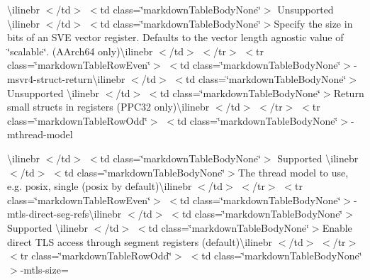 \begin{longtabu}
{\ttfamily \textbackslash{}ilinebr \texorpdfstring{$<$}{<}/td\texorpdfstring{$>$}{>} \texorpdfstring{$<$}{<}td class=\char`\"{}markdown\+Table\+Body\+None\char`\"{}\texorpdfstring{$>$}{>} Unsupported \textbackslash{}ilinebr \texorpdfstring{$<$}{<}/td\texorpdfstring{$>$}{>} \texorpdfstring{$<$}{<}td class=\char`\"{}markdown\+Table\+Body\+None\char`\"{}\texorpdfstring{$>$}{>}}Specify the size in bits of an SVE vector register. Defaults to the vector length agnostic value of \char`\"{}scalable\char`\"{}. (AArch64 only){\ttfamily \textbackslash{}ilinebr \texorpdfstring{$<$}{<}/td\texorpdfstring{$>$}{>} \texorpdfstring{$<$}{<}/tr\texorpdfstring{$>$}{>} \texorpdfstring{$<$}{<}tr class=\char`\"{}markdown\+Table\+Row\+Even\char`\"{}\texorpdfstring{$>$}{>} \texorpdfstring{$<$}{<}td class=\char`\"{}markdown\+Table\+Body\+None\char`\"{}\texorpdfstring{$>$}{>}}-\/msvr4-\/struct-\/return{\ttfamily \textbackslash{}ilinebr \texorpdfstring{$<$}{<}/td\texorpdfstring{$>$}{>} \texorpdfstring{$<$}{<}td class=\char`\"{}markdown\+Table\+Body\+None\char`\"{}\texorpdfstring{$>$}{>} Unsupported \textbackslash{}ilinebr \texorpdfstring{$<$}{<}/td\texorpdfstring{$>$}{>} \texorpdfstring{$<$}{<}td class=\char`\"{}markdown\+Table\+Body\+None\char`\"{}\texorpdfstring{$>$}{>}}Return small structs in registers (PPC32 only){\ttfamily \textbackslash{}ilinebr \texorpdfstring{$<$}{<}/td\texorpdfstring{$>$}{>} \texorpdfstring{$<$}{<}/tr\texorpdfstring{$>$}{>} \texorpdfstring{$<$}{<}tr class=\char`\"{}markdown\+Table\+Row\+Odd\char`\"{}\texorpdfstring{$>$}{>} \texorpdfstring{$<$}{<}td class=\char`\"{}markdown\+Table\+Body\+None\char`\"{}\texorpdfstring{$>$}{>}}-\/mthread-\/model 

{\ttfamily \textbackslash{}ilinebr \texorpdfstring{$<$}{<}/td\texorpdfstring{$>$}{>} \texorpdfstring{$<$}{<}td class=\char`\"{}markdown\+Table\+Body\+None\char`\"{}\texorpdfstring{$>$}{>} Supported \textbackslash{}ilinebr \texorpdfstring{$<$}{<}/td\texorpdfstring{$>$}{>} \texorpdfstring{$<$}{<}td class=\char`\"{}markdown\+Table\+Body\+None\char`\"{}\texorpdfstring{$>$}{>}}The thread model to use, e.\+g. posix, single (posix by default){\ttfamily \textbackslash{}ilinebr \texorpdfstring{$<$}{<}/td\texorpdfstring{$>$}{>} \texorpdfstring{$<$}{<}/tr\texorpdfstring{$>$}{>} \texorpdfstring{$<$}{<}tr class=\char`\"{}markdown\+Table\+Row\+Even\char`\"{}\texorpdfstring{$>$}{>} \texorpdfstring{$<$}{<}td class=\char`\"{}markdown\+Table\+Body\+None\char`\"{}\texorpdfstring{$>$}{>}}-\/mtls-\/direct-\/seg-\/refs{\ttfamily \textbackslash{}ilinebr \texorpdfstring{$<$}{<}/td\texorpdfstring{$>$}{>} \texorpdfstring{$<$}{<}td class=\char`\"{}markdown\+Table\+Body\+None\char`\"{}\texorpdfstring{$>$}{>} Supported \textbackslash{}ilinebr \texorpdfstring{$<$}{<}/td\texorpdfstring{$>$}{>} \texorpdfstring{$<$}{<}td class=\char`\"{}markdown\+Table\+Body\+None\char`\"{}\texorpdfstring{$>$}{>}}Enable direct TLS access through segment registers (default){\ttfamily \textbackslash{}ilinebr \texorpdfstring{$<$}{<}/td\texorpdfstring{$>$}{>} \texorpdfstring{$<$}{<}/tr\texorpdfstring{$>$}{>} \texorpdfstring{$<$}{<}tr class=\char`\"{}markdown\+Table\+Row\+Odd\char`\"{}\texorpdfstring{$>$}{>} \texorpdfstring{$<$}{<}td class=\char`\"{}markdown\+Table\+Body\+None\char`\"{}\texorpdfstring{$>$}{>}}-\/mtls-\/size=


\end{longtabu}
